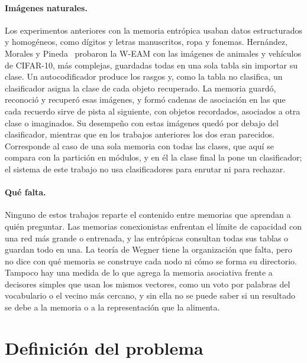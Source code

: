 \paragraph{Imágenes naturales.}
Los experimentos anteriores con la memoria entrópica usaban datos estructurados y
homogéneos, como dígitos y letras manuscritos, ropa y fonemas.
Hernández, Morales y Pineda~\cite{hernandez2026cifar} probaron la W-EAM con las imágenes
de animales y vehículos de CIFAR-10, más complejas, guardadas todas en una sola tabla sin
importar su clase.
Un autocodificador produce los rasgos y, como la tabla no clasifica, un clasificador
asigna la clase de cada objeto recuperado.
La memoria guardó, reconoció y recuperó esas imágenes, y formó cadenas de asociación en
las que cada recuerdo sirve de pista al siguiente, con objetos recordados, asociados a
otra clase o imaginados.
Su desempeño con estas imágenes quedó por debajo del clasificador, mientras que en los
trabajos anteriores los dos eran parecidos.
Corresponde al caso de una sola memoria con todas las clases, que aquí se compara con la
partición en módulos, y en él la clase final la pone un clasificador; el sistema de este
trabajo no usa clasificadores para enrutar ni para rechazar.

\paragraph{Qué falta.}
Ninguno de estos trabajos reparte el contenido entre memorias que aprendan a quién
preguntar.
Las memorias conexionistas enfrentan el límite de capacidad con una red más grande o
entrenada, y las entrópicas consultan todas sus tablas o guardan todo en una.
La teoría de Wegner tiene la organización que falta, pero no dice con qué memoria se
construye cada nodo ni cómo se forma su directorio.
Tampoco hay una medida de lo que agrega la memoria asociativa frente a decisores simples
que usan los mismos vectores, como un voto por palabras del vocabulario o el vecino más
cercano, y sin ella no se puede saber si un resultado se debe a la memoria o a la
representación que la alimenta.

\section{Definición del problema}
\label{sec:definicion-problema}

